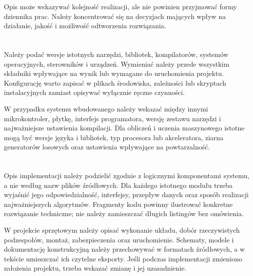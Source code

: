 Opis może wskazywać kolejność realizacji, ale nie powinien przyjmować formy dziennika prac. Należy koncentrować się na decyzjach mających wpływ na działanie, jakość i możliwość odtworzenia rozwiązania.

\section{}

Należy podać wersje istotnych narzędzi, bibliotek, kompilatorów, systemów operacyjnych, sterowników i urządzeń. Wymieniać należy przede wszystkim składniki wpływające na wynik lub wymagane do uruchomienia projektu. Konfigurację warto zapisać w plikach środowiska, zależności lub skryptach instalacyjnych zamiast opisywać wyłącznie ręczne czynności.

W przypadku systemu wbudowanego należy wskazać między innymi mikrokontroler, płytkę, interfejs programatora, wersję zestawu narzędzi i najważniejsze ustawienia kompilacji. Dla obliczeń i uczenia maszynowego istotne mogą być wersje języka i bibliotek, typ procesora lub akceleratora, ziarna generatorów losowych oraz ustawienia wpływające na powtarzalność.

\section{}

Opis implementacji należy podzielić zgodnie z logicznymi komponentami systemu, a nie według nazw plików źródłowych. Dla każdego istotnego modułu trzeba wyjaśnić jego odpowiedzialność, interfejsy, przepływ danych oraz sposób realizacji najważniejszych algorytmów. Fragmenty kodu powinny ilustrować konkretne rozwiązanie techniczne; nie należy zamieszczać długich listingów bez omówienia.

W projekcie sprzętowym należy opisać wykonanie układu, dobór rzeczywistych podzespołów, montaż, zabezpieczenia oraz uruchomienie. Schematy, modele i dokumentację konstrukcyjną należy przechowywać w formatach źródłowych, a w tekście umieszczać ich czytelne eksporty. Jeśli podczas implementacji zmieniono założenia projektu, trzeba wskazać zmianę i jej uzasadnienie.

\section{}

